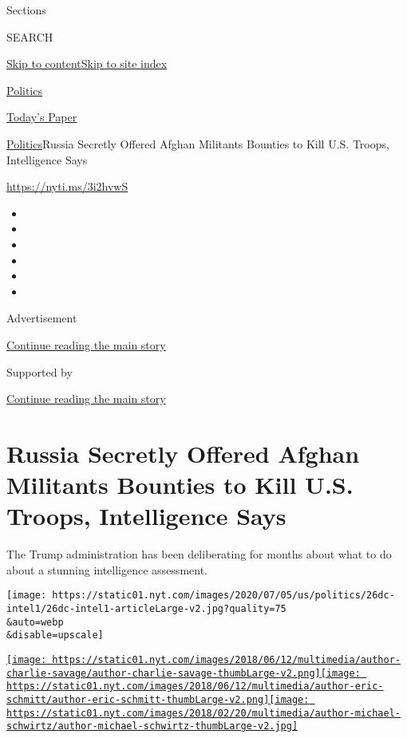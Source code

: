 Sections

SEARCH

\protect\hyperlink{site-content}{Skip to
content}\protect\hyperlink{site-index}{Skip to site index}

\href{https://www.nytimes.com/section/politics}{Politics}

\href{https://myaccount.nytimes.com/auth/login?response_type=cookie\&client_id=vi}{}

\href{https://www.nytimes.com/section/todayspaper}{Today's Paper}

\href{/section/politics}{Politics}\textbar{}Russia Secretly Offered
Afghan Militants Bounties to Kill U.S. Troops, Intelligence Says

\url{https://nyti.ms/3i2hvwS}

\begin{itemize}
\item
\item
\item
\item
\item
\item
\end{itemize}

Advertisement

\protect\hyperlink{after-top}{Continue reading the main story}

Supported by

\protect\hyperlink{after-sponsor}{Continue reading the main story}

\hypertarget{russia-secretly-offered-afghan-militants-bounties-to-kill-us-troops-intelligence-says}{%
\section{Russia Secretly Offered Afghan Militants Bounties to Kill U.S.
Troops, Intelligence
Says}\label{russia-secretly-offered-afghan-militants-bounties-to-kill-us-troops-intelligence-says}}

The Trump administration has been deliberating for months about what to
do about a stunning intelligence assessment.

\texttt{[image: https://static01.nyt.com/images/2020/07/05/us/politics/26dc-intel1/26dc-intel1-articleLarge-v2.jpg?quality=75\\\&auto=webp\\\&disable=upscale]}

\href{https://www.nytimes.com/by/charlie-savage}{\texttt{[image: https://static01.nyt.com/images/2018/06/12/multimedia/author-charlie-savage/author-charlie-savage-thumbLarge-v2.png]}}\href{https://www.nytimes.com/by/eric-schmitt}{\texttt{[image: https://static01.nyt.com/images/2018/06/12/multimedia/author-eric-schmitt/author-eric-schmitt-thumbLarge-v2.png]}}\href{https://www.nytimes.com/by/michael-schwirtz}{\texttt{[image: https://static01.nyt.com/images/2018/02/20/multimedia/author-michael-schwirtz/author-michael-schwirtz-thumbLarge-v2.jpg]}}

